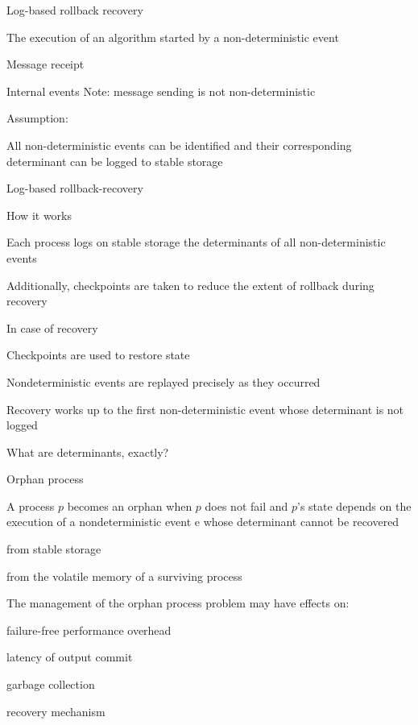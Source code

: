 \begin{frame}{Log-based rollback recovery}
	
\begin{definition}
The execution of an algorithm started by a non-deterministic event
	\BI
	\item Message receipt
	\item Internal events
	\EI
Note: message sending is not non-deterministic
\end{definition}

\bigskip
Assumption:
	\BI
	\item All non-deterministic events can be identified and their corresponding determinant can be logged to stable storage
	\EI
\end{frame}
\begin{frame}{Log-based rollback-recovery}
\BIL
\item \alert{How it works}
	\BI
	\item Each process logs on stable storage the determinants of all non-deterministic events
	\item Additionally, checkpoints are taken to reduce the extent of rollback during recovery
	\EI
\item \alert{In case of recovery}
	\BI
	\item Checkpoints are used to restore state
	\item Nondeterministic events are replayed precisely as they occurred
	\item Recovery works up to the first non-deterministic event whose determinant is not logged
	\EI
\item What are \alert{determinants}, exactly?
\EIL
\end{frame}
\begin{frame}{Orphan process}
\begin{definition}
A process $p$ becomes an orphan when $p$ does not fail and $p$'s state depends on the execution of a nondeterministic event e whose determinant cannot be recovered
\BI
\item from stable storage
\item from the volatile memory of a surviving process
\EI
\end{definition}

\bigskip
The management of the orphan process problem may have effects on:
\BI
\item failure-free performance overhead
\item latency of output commit
\item garbage collection
\item recovery mechanism	
\EI

\end{frame}
